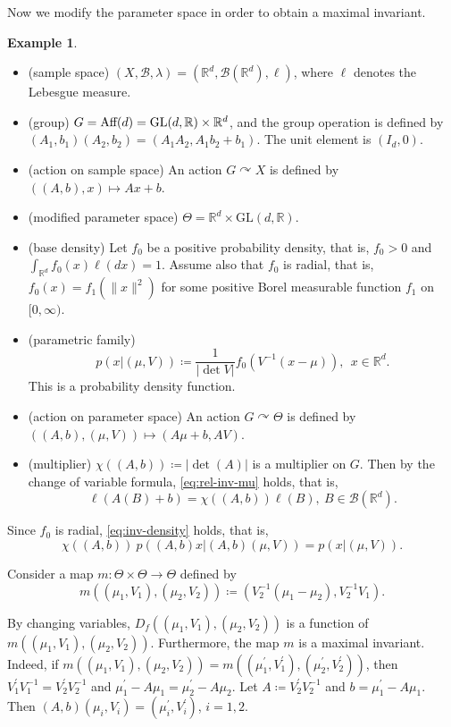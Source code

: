 \documentclass[a4paper, reqno, 11pt]{article}
\theoremstyle{definition}
\newtheorem{Exa}[Thm]{Example}
\def\GL{\mathrm{GL}}
\begin{document}
Now we modify the parameter space in order to obtain a maximal invariant. 


\begin{Exa}\label{exa:modified}

\!

\begin{itemize}
\item (sample space) $(X, \mathcal{B}, \lambda) = (\mathbb{R}^d, \mathcal{B}(\mathbb{R}^d), \ell)$, where $\ell$ denotes the Lebesgue measure.  
\item (group) $G = \textup{Aff}(d) = \GL(d, \mathbb{R}) \times \mathbb{R}^d$, and the group operation is defined by $(A_1, b_1)(A_2, b_2) = (A_1 A_2, A_1 b_2 + b_1)$. 
The unit element is $(I_d, 0)$. 
\item (action on sample space) An action $G \curvearrowright X$ is defined by $((A,b), x) \mapsto Ax + b$. 
\item (modified parameter space) $\Theta = \mathbb{R}^d \times \GL(d, \mathbb{R})$. 
\item (base density) Let $f_0$ be a positive probability density, that is, $f_0 > 0$ and $\displaystyle \int_{\mathbb{R}^d} f_0 (x) \ell(dx) = 1$. 
Assume also that $f_0$ is radial, that is, $f_0 (x) = f_1 \left(\|x\|^2\right)$ for some positive Borel measurable function $f_1$ on $[0,\infty)$.
\item (parametric family) 
\[ p\left(x | (\mu, V) \right) \coloneqq   \frac{1}{|\det V|} f_0 \left(V^{-1}(x - \mu)\right), \ \ x \in \mathbb{R}^d. \]
This is a probability density function. 
\item (action on parameter space) An action $G \curvearrowright \Theta$ is defined by $((A,b), (\mu, V)) \mapsto (A\mu + b, A V)$. 
\item (multiplier) $\chi((A,b)) \coloneqq   |\det(A)|$ is a multiplier on $G$. 
Then by the change of variable formula, \eqref{eq:rel-inv-mu} holds, that is, 
\[ \ell(A(B) + b) = \chi((A,b)) \ell(B), \ B \in \mathcal{B}(\mathbb{R}^d). \] 
\end{itemize}


Since $f_0$ is radial, \eqref{eq:inv-density} holds, that is, 
\[ \chi((A,b)) \ p\left((A,b)x | (A,b)(\mu, V)\right) = p\left(x | (\mu, V)\right). \]

Consider a  map $m \colon \Theta \times \Theta \to \Theta$ defined by 
\[ m\left((\mu_1, V_1), (\mu_2, V_2)\right) \coloneqq   \left(V_2^{-1} (\mu_1 - \mu_2),  V_2^{-1} V_1 \right). \]

By changing variables, 
$D_f \left((\mu_1, V_1), (\mu_2, V_2)\right) $ is a function of $m\left((\mu_1, V_1), (\mu_2, V_2)\right)$. 
Furthermore, the map $m$ is a maximal invariant. 
Indeed, 
if $m\left((\mu_1, V_1), (\mu_2, V_2)\right) = m\left((\mu_1^{\prime}, V_1^{\prime}), (\mu_2^{\prime}, V_2^{\prime})\right)$, 
then  $V_1^{\prime} V_1^{-1} = V_2^{\prime} V_2^{-1}$ and $\mu_1^{\prime} - A \mu_1 = \mu_2^{\prime} - A \mu_2$. 
Let $A \coloneqq   V_2^{\prime} V_2^{-1}$ and $b = \mu_1^{\prime} - A \mu_1$. 
Then $(A,b) (\mu_i, V_i) = (\mu_i^{\prime}, V_i^{\prime})$, $i=1,2$. 


\end{Exa}
\end{document}
